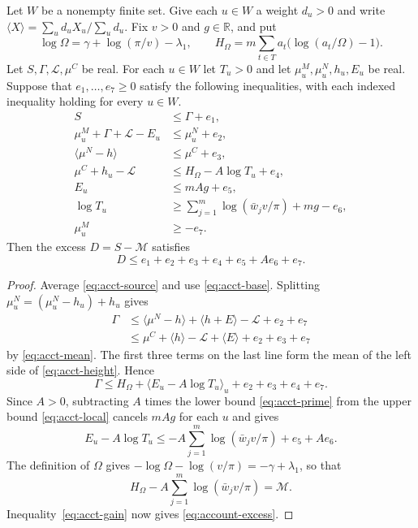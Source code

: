 \begin{proposition}\label{prop:accounting}
Let $W$ be a nonempty finite set. Give each $u\in W$ a weight $d_u>0$
and write $\langle X\rangle=\sum_u d_u X_u/\sum_u d_u$.
Fix $v>0$ and $g\in\mathbb R$, and put
\[
  \log\Omega=\gamma+\log(\pi/v)-\lambda_1,\qquad
  H_\Omega=m\sum_{t\in T}a_t\bigl(\log(a_t/\Omega)-1\bigr).
\]
Let $S,\Gamma,\mathcal L,\mu^C$ be real. For each $u\in W$ let $T_u>0$
and let $\mu^M_u,\mu^N_u,h_u,E_u$ be real. Suppose that
$e_1,\ldots,e_7\ge0$ satisfy the following inequalities, with each
indexed inequality holding for every $u\in W$.
\begin{align}
  S &\le \Gamma+e_1, \label{eq:acct-gain}\\
  \mu^M_u+\Gamma+\mathcal L-E_u &\le \mu^N_u+e_2,
    \label{eq:acct-source}\\
  \langle\mu^N-h\rangle &\le \mu^C+e_3, \label{eq:acct-mean}\\
  \mu^C+h_u-\mathcal L &\le H_\Omega-A\log T_u+e_4,
    \label{eq:acct-height}\\
  E_u &\le mAg+e_5, \label{eq:acct-local}\\
  \log T_u &\ge \sum_{j=1}^m\log(\bar w_j v/\pi)+mg-e_6,
    \label{eq:acct-prime}\\
  \mu^M_u &\ge -e_7. \label{eq:acct-base}
\end{align}
Then the excess $D=S-\mathcal M$ satisfies
\begin{equation}\label{eq:account-excess}
  D\le e_1+e_2+e_3+e_4+e_5+Ae_6+e_7.
\end{equation}
\end{proposition}

\begin{proof}
Average \eqref{eq:acct-source} and use \eqref{eq:acct-base}. Splitting
$\mu^N_u=(\mu^N_u-h_u)+h_u$ gives
\begin{align*}
  \Gamma
  &\le \langle\mu^N-h\rangle+\langle h+E\rangle-\mathcal L+e_2+e_7\\
  &\le \mu^C+\langle h\rangle-\mathcal L+\langle E\rangle+e_2+e_3+e_7
\end{align*}
by \eqref{eq:acct-mean}. The first three terms on the last line form
the mean of the left side of \eqref{eq:acct-height}. Hence
\[
  \Gamma\le H_\Omega+\big\langle E_u-A\log T_u\big\rangle_u
    +e_2+e_3+e_4+e_7.
\]
Since $A>0$, subtracting $A$ times the lower bound
\eqref{eq:acct-prime} from the upper bound \eqref{eq:acct-local} cancels
$mAg$ for each $u$ and gives
\[
  E_u-A\log T_u
  \le -A\sum_{j=1}^m\log(\bar w_j v/\pi)+e_5+Ae_6.
\]
The definition of $\Omega$ gives $-\log\Omega-\log(v/\pi)=-\gamma+\lambda_1$,
so that
\[
  H_\Omega-A\sum_{j=1}^m\log(\bar w_j v/\pi)=\mathcal M.
\]
Inequality~\eqref{eq:acct-gain} now gives \eqref{eq:account-excess}.
\end{proof}

